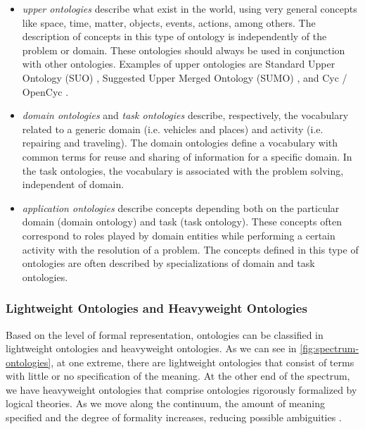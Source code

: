 \begin{itemize}
\item \emph{upper ontologies} describe what exist in the world, using very general concepts like space, time, matter, objects, events, actions, among others. The description of concepts in this type of ontology is independently of the problem or domain. These ontologies should always be used in conjunction with other ontologies. Examples of upper ontologies are Standard Upper Ontology (SUO) \cite{PeaseNiles2002}, Suggested Upper Merged Ontology (SUMO) \cite{PeaseNilesLi2002}, and Cyc / OpenCyc \cite{MatuszekCabralWitbrockDeOliveira2006}.

\item \emph{domain ontologies} and \emph{task ontologies} describe, respectively, the vocabulary related to a generic domain (i.e. vehicles and places) and activity (i.e. repairing and traveling). The domain ontologies define a vocabulary with common terms for reuse and sharing of information for a specific domain. In the task ontologies, the vocabulary is associated with the problem solving, independent of domain.

\item \emph{application ontologies} describe concepts depending both on the particular domain (domain ontology) and task (task ontology). These concepts often correspond to roles played by domain entities while performing a certain activity with the resolution of a problem. The concepts defined in this type of ontologies are often described by specializations of domain and task ontologies.
\end{itemize}



\subsubsection{Lightweight Ontologies and Heavyweight Ontologies}
\label{subsubsec:lightweight-ontologies}

Based on the level of formal representation, ontologies can be classified in lightweight ontologies and heavyweight ontologies. As we can see in \autoref{fig:spectrum-ontologies}, at one extreme, there are lightweight ontologies that consist of terms with little or no specification of the meaning. At the other end of the spectrum, we have heavyweight ontologies that comprise ontologies rigorously formalized by logical theories. As we move along the continuum, the amount of meaning specified and the degree of formality increases, reducing possible ambiguities \cite{UscholdGruninger2004}.

